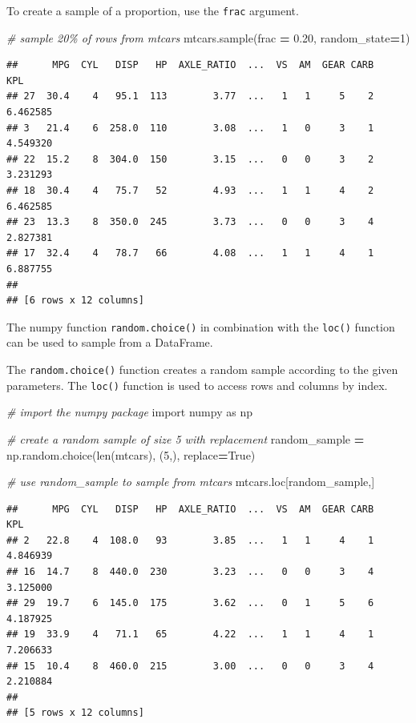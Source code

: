 \documentclass[
]{book}
\newenvironment{Shaded}{\begin{snugshade}}{\end{snugshade}}
\newcommand{\BuiltInTok}[1]{#1}
\newcommand{\CommentTok}[1]{\textcolor[rgb]{0.56,0.35,0.01}{\textit{#1}}}
\newcommand{\DecValTok}[1]{\textcolor[rgb]{0.00,0.00,0.81}{#1}}
\newcommand{\FloatTok}[1]{\textcolor[rgb]{0.00,0.00,0.81}{#1}}
\newcommand{\ImportTok}[1]{#1}
\newcommand{\NormalTok}[1]{#1}
\newcommand{\OperatorTok}[1]{\textcolor[rgb]{0.81,0.36,0.00}{\textbf{#1}}}
\newcommand{\VariableTok}[1]{\textcolor[rgb]{0.00,0.00,0.00}{#1}}
\begin{document}
To create a sample of a proportion, use the \texttt{frac} argument.

\begin{Shaded}
\begin{Highlighting}[]
\CommentTok{\# sample 20\% of rows from mtcars}
\NormalTok{mtcars.sample(frac }\OperatorTok{=} \FloatTok{0.20}\NormalTok{, random\_state}\OperatorTok{=}\DecValTok{1}\NormalTok{)}
\end{Highlighting}
\end{Shaded}

\begin{verbatim}
##      MPG  CYL   DISP   HP  AXLE_RATIO  ...  VS  AM  GEAR CARB       KPL
## 27  30.4    4   95.1  113        3.77  ...   1   1     5    2  6.462585
## 3   21.4    6  258.0  110        3.08  ...   1   0     3    1  4.549320
## 22  15.2    8  304.0  150        3.15  ...   0   0     3    2  3.231293
## 18  30.4    4   75.7   52        4.93  ...   1   1     4    2  6.462585
## 23  13.3    8  350.0  245        3.73  ...   0   0     3    4  2.827381
## 17  32.4    4   78.7   66        4.08  ...   1   1     4    1  6.887755
## 
## [6 rows x 12 columns]
\end{verbatim}

The numpy function \texttt{random.choice()} in combination with the \texttt{loc()} function can be used to sample from a DataFrame.

The \texttt{random.choice()} function creates a random sample according to the given parameters. The \texttt{loc()} function is used to access rows and columns by index.

\begin{Shaded}
\begin{Highlighting}[]
\CommentTok{\# import the numpy package}
\ImportTok{import}\NormalTok{ numpy }\ImportTok{as}\NormalTok{ np}

\CommentTok{\# create a random sample of size 5 with replacement}
\NormalTok{random\_sample }\OperatorTok{=}\NormalTok{ np.random.choice(}\BuiltInTok{len}\NormalTok{(mtcars), (}\DecValTok{5}\NormalTok{,), replace}\OperatorTok{=}\VariableTok{True}\NormalTok{)}

\CommentTok{\# use random\_sample to sample from mtcars}
\NormalTok{mtcars.loc[random\_sample,]}
\end{Highlighting}
\end{Shaded}

\begin{verbatim}
##      MPG  CYL   DISP   HP  AXLE_RATIO  ...  VS  AM  GEAR CARB       KPL
## 2   22.8    4  108.0   93        3.85  ...   1   1     4    1  4.846939
## 16  14.7    8  440.0  230        3.23  ...   0   0     3    4  3.125000
## 29  19.7    6  145.0  175        3.62  ...   0   1     5    6  4.187925
## 19  33.9    4   71.1   65        4.22  ...   1   1     4    1  7.206633
## 15  10.4    8  460.0  215        3.00  ...   0   0     3    4  2.210884
## 
## [5 rows x 12 columns]
\end{verbatim}
\end{document}
